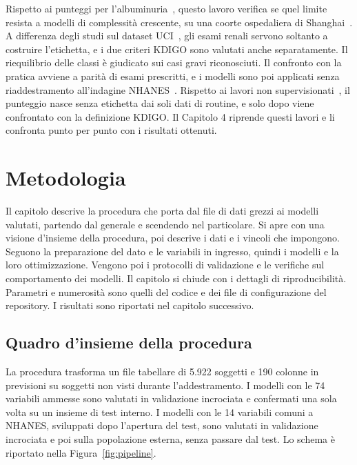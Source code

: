 \documentclass[a4paper, 12pt, oneside]{book}
\begin{document}
Rispetto ai punteggi per l'albuminuria~\cite{muntner_development_2011,bragg-gresham_using_2025,yoo_merwacs_2026}, questo lavoro verifica se quel limite resista a modelli di complessità crescente, su una coorte ospedaliera di Shanghai~\cite{li_bimodal_2026}. A differenza degli studi sul dataset UCI~\cite{qin_machine_2020,chittora_prediction_2021}, gli esami renali servono soltanto a costruire l'etichetta, e i due criteri KDIGO sono valutati anche separatamente. Il riequilibrio delle classi è giudicato sui casi gravi riconosciuti. Il confronto con la pratica avviene a parità di esami prescritti, e i modelli sono poi applicati senza riaddestramento all'indagine NHANES~\cite{nhanes_cdc}. Rispetto ai lavori non supervisionati~\cite{zheng_subtyping_2021,ahlqvist_novel_2018}, il punteggio nasce senza etichetta dai soli dati di routine, e solo dopo viene confrontato con la definizione KDIGO. Il Capitolo 4 riprende questi lavori e li confronta punto per punto con i risultati ottenuti.

\chapter{Metodologia}

Il capitolo descrive la procedura che porta dal file di dati grezzi ai modelli valutati, partendo dal generale e scendendo nel particolare. Si apre con una visione d'insieme della procedura, poi descrive i dati e i vincoli che impongono. Seguono la preparazione del dato e le variabili in ingresso, quindi i modelli e la loro ottimizzazione. Vengono poi i protocolli di validazione e le verifiche sul comportamento dei modelli. Il capitolo si chiude con i dettagli di riproducibilità. Parametri e numerosità sono quelli del codice e dei file di configurazione del repository. I risultati sono riportati nel capitolo successivo.

\section{Quadro d'insieme della procedura}

La procedura trasforma un file tabellare di 5.922 soggetti e 190 colonne in previsioni su soggetti non visti durante l'addestramento. I modelli con le 74 variabili ammesse sono valutati in validazione incrociata e confermati una sola volta su un insieme di test interno. I modelli con le 14 variabili comuni a NHANES, sviluppati dopo l'apertura del test, sono valutati in validazione incrociata e poi sulla popolazione esterna, senza passare dal test. Lo schema è riportato nella Figura~\ref{fig:pipeline}.
\end{document}

